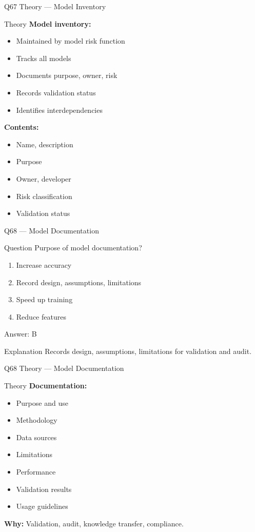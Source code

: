 \documentclass[aspectratio=169,8pt]{beamer}
\begin{document}
	\begin{frame}{Q67 Theory --- Model Inventory}
		\begin{block}{Theory}
			\textbf{Model inventory:}
			\begin{itemize}
				\item Maintained by model risk function
				\item Tracks all models
				\item Documents purpose, owner, risk
				\item Records validation status
				\item Identifies interdependencies
			\end{itemize}
			\textbf{Contents:}
			\begin{itemize}
				\item Name, description
				\item Purpose
				\item Owner, developer
				\item Risk classification
				\item Validation status
			\end{itemize}
		\end{block}
	\end{frame}
	
	\begin{frame}{Q68 --- Model Documentation}
		\begin{block}{Question}
			Purpose of model documentation?
		\end{block}
		\begin{enumerate}[label=\Alph*.]
			\item Increase accuracy
			\item Record design, assumptions, limitations
			\item Speed up training
			\item Reduce features
		\end{enumerate}
		\begin{exampleblock}{Answer: B}
		\end{exampleblock}
		\begin{block}{Explanation}
			Records design, assumptions, limitations for validation and audit.
		\end{block}
	\end{frame}
	
	\begin{frame}{Q68 Theory --- Model Documentation}
		\begin{block}{Theory}
			\textbf{Documentation:}
			\begin{itemize}
				\item Purpose and use
				\item Methodology
				\item Data sources
				\item Limitations
				\item Performance
				\item Validation results
				\item Usage guidelines
			\end{itemize}
			\textbf{Why:} Validation, audit, knowledge transfer, compliance.
		\end{block}
	\end{frame}
	
\end{document}
